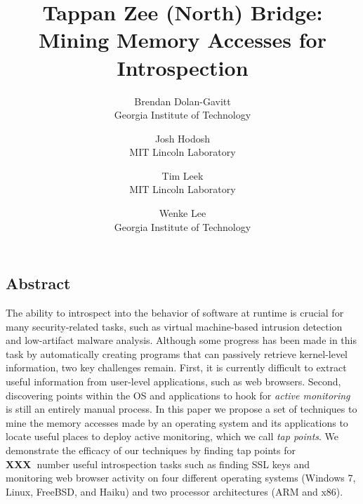 \documentclass[letterpaper,twocolumn,10pt]{article}
\newcommand{\fixme}{{\bf XXX\ }}
\begin{document}
\date{}

\title{\Large \bf Tappan Zee (North) Bridge: Mining Memory Accesses for Introspection}

\author{
{\rm Brendan Dolan-Gavitt}\\
Georgia Institute of Technology
\and
{\rm Josh Hodosh}\\
MIT Lincoln Laboratory
\and
{\rm Tim Leek}\\
MIT Lincoln Laboratory
\and
{\rm Wenke Lee}\\
Georgia Institute of Technology
} %

\maketitle


\subsection*{Abstract}

The ability to introspect into the behavior of software at runtime is
crucial for many security-related tasks, such as virtual machine-based
intrusion detection and low-artifact malware analysis. Although some
progress has been made in this task by automatically creating programs
that can passively retrieve kernel-level information, two key challenges
remain. First, it is currently difficult to extract useful information
from user-level applications, such as web browsers. Second, discovering
points within the OS and applications to hook for \emph{active
monitoring} is still an entirely manual process. In this paper we
propose a set of techniques to mine the memory accesses made by an
operating system and its applications to locate useful places to deploy
active monitoring, which we call \emph{tap points}. We demonstrate the
efficacy of our techniques by finding tap points for \fixme{number}
useful introspection tasks such as finding SSL keys and monitoring web
browser activity on four different operating systems (Windows 7, Linux,
FreeBSD, and Haiku) and two processor architectures (ARM and x86).




\end{document}

